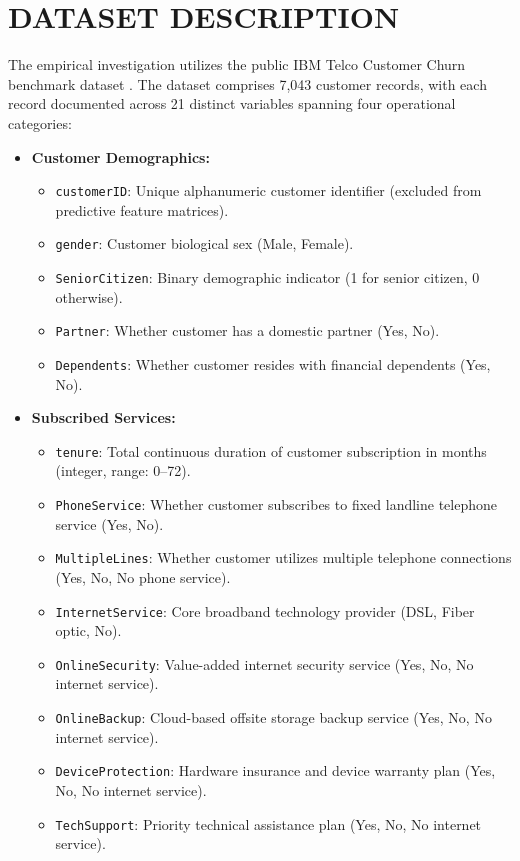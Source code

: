 \documentclass[12pt,a4paper]{report}
\newcommand{\datasetTotalRows}{7,043}
\begin{document}
\section{DATASET DESCRIPTION}
The empirical investigation utilizes the public IBM Telco Customer Churn benchmark dataset \citep{ibm2019telco}. The dataset comprises \datasetTotalRows{} customer records, with each record documented across 21 distinct variables spanning four operational categories:
\begin{itemize}
    \item \textbf{Customer Demographics:}
    \begin{itemize}
        \item \texttt{customerID}: Unique alphanumeric customer identifier (excluded from predictive feature matrices).
        \item \texttt{gender}: Customer biological sex (Male, Female).
        \item \texttt{SeniorCitizen}: Binary demographic indicator (1 for senior citizen, 0 otherwise).
        \item \texttt{Partner}: Whether customer has a domestic partner (Yes, No).
        \item \texttt{Dependents}: Whether customer resides with financial dependents (Yes, No).
    \end{itemize}
    \item \textbf{Subscribed Services:}
    \begin{itemize}
        \item \texttt{tenure}: Total continuous duration of customer subscription in months (integer, range: 0--72).
        \item \texttt{PhoneService}: Whether customer subscribes to fixed landline telephone service (Yes, No).
        \item \texttt{MultipleLines}: Whether customer utilizes multiple telephone connections (Yes, No, No phone service).
        \item \texttt{InternetService}: Core broadband technology provider (DSL, Fiber optic, No).
        \item \texttt{OnlineSecurity}: Value-added internet security service (Yes, No, No internet service).
        \item \texttt{OnlineBackup}: Cloud-based offsite storage backup service (Yes, No, No internet service).
        \item \texttt{DeviceProtection}: Hardware insurance and device warranty plan (Yes, No, No internet service).
        \item \texttt{TechSupport}: Priority technical assistance plan (Yes, No, No internet service).

\end{itemize}
\end{itemize}
\end{document}
